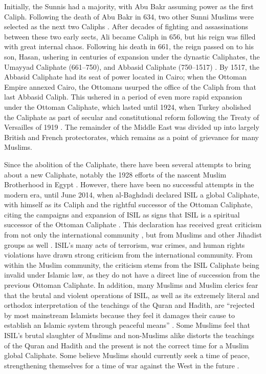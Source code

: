 \documentclass{report}
\begin{document}
Initially, the Sunnis had a majority, with Abu Bakr assuming power as the first Caliph. Following the death of Abu Bakr in 634, two other Sunni Muslims were selected as the next two Caliphs \cite{schmidt2004great}. After decades of fighting and assassinations between these two early sects, Ali became Caliph in 656, but his reign was filled with great internal chaos. Following his death in 661, the reign passed on to his son, Hasan, ushering in centuries of expansion under the dynastic Caliphates, the Umayyad Caliphate (661–750), and Abbasid Caliphate (750–1517) \cite{schmidt2004great,oliver2009caliphate}. By 1517, the Abbasid Caliphate had its seat of power located in Cairo; when the Ottoman Empire annexed Cairo, the Ottomans usurped the office of the Caliph from that last Abbasid Caliph. This ushered in a period of even more rapid expansion under  the Ottoman Caliphate, which lasted until 1924, when Turkey abolished the Caliphate as part of secular and constitutional reform following the Treaty of Versailles of 1919 \cite{schmidt2004great,ozoglu2011caliphate}. The remainder of the Middle East was divided up into largely British and French protectorates, which remains as a point of grievance for many Muslims.

Since the abolition of the Caliphate, there have been several attempts to bring about a new Caliphate, notably the  1928 efforts of the nascent Muslim Brotherhood in Egypt \cite{Tolson2008,gabriel2008they}. However, there have been no successful attempts in the modern era, until  June 2014, when al-Baghdadi declared ISIL a global Caliphate, with himself as its Caliph and the rightful successor of the Ottoman Caliphate, citing the campaigns and expansion of ISIL as signs that ISIL is a spiritual successor of the Ottoman Caliphate \cite{Mortada2014,TheWeek2014}.  This declaration has received great criticism from not only the international community \cite{Gomes2007}, but from Muslims and other Jihadist groups as well \cite{Mandhai2014,Moore2014}. ISIL's many acts of terrorism, war crimes, and human rights violations have drawn strong criticism from the international community. From within the Muslim community, the criticism stems from the ISIL Caliphate being invalid under Islamic law, as they do not have a direct line of succession from the previous Ottoman Caliphate. In addition, many Muslims and Muslim clerics fear that the brutal and violent operations of ISIL, as well as its extremely literal and orthodox interpretation of the teachings of  the Quran and Hadith, are \enquote{rejected by most mainstream Islamists because they feel it damages their cause to establish an Islamic system through peaceful means} \cite{Mandhai2014}. Some Muslims feel that ISIL's brutal slaughter of Muslims and non-Muslims alike distorts the teachings of the Quran and Hadith and the present is not the correct time for a Muslim global Caliphate. Some believe Muslims  should currently seek a time of peace, strengthening themselves for a time of war against the West in the future \cite{schmidt2004great,Moore2014,Wood2015}.
\end{document}
